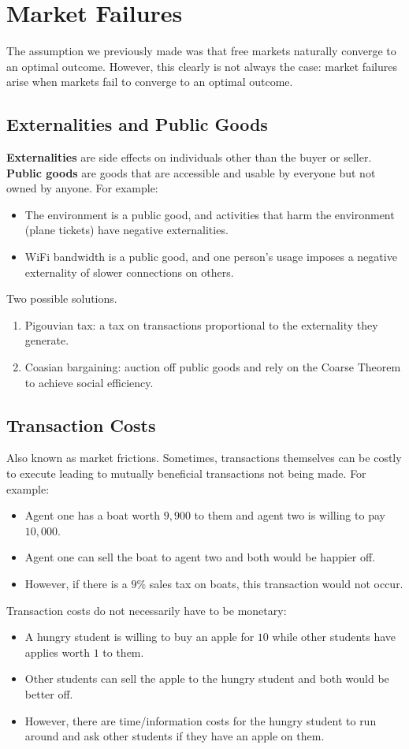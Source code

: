 \documentclass[dvipsnames]{article}
\theoremstyle{definition}
\theoremstyle{remark}
\begin{document}
\newpage

\section{Market Failures}
The assumption we previously made was that free markets naturally converge to an optimal outcome. However, this clearly is not always the case: market failures arise when markets fail to converge to an optimal outcome. 

\subsection{Externalities and Public Goods}
\textbf{Externalities} are side effects on individuals other than the buyer or seller. \textbf{Public goods} are goods that are accessible and usable by everyone but not owned by anyone. For example:
\begin{itemize}
	\item The environment is a public good, and activities that harm the environment (plane tickets) have negative externalities.
	\item WiFi bandwidth is a public good, and one person's usage imposes a negative externality of slower connections on others. 
\end{itemize}
Two possible solutions.
\begin{enumerate}
	\item Pigouvian tax: a tax on transactions proportional to the externality they generate.
	\item Coasian bargaining: auction off public goods and rely on the Coarse Theorem to achieve social efficiency. 
\end{enumerate}

\subsection{Transaction Costs}
Also known as market frictions. Sometimes, transactions themselves can be costly to execute leading to mutually beneficial transactions not being made. For example:
\begin{itemize}
	\item Agent one has a boat worth $9,900$ to them and agent two is willing to pay $10,000$.
	\item Agent one can sell the boat to agent two and both would be happier off. 
	\item However, if there is a $9\%$ sales tax on boats, this transaction would not occur. 
\end{itemize}
Transaction costs do not necessarily have to be monetary:
\begin{itemize}
	\item A hungry student is willing to buy an apple for $10$ while other students have applies worth $1$ to them. 
	\item Other students can sell the apple to the hungry student and both would be better off.
	\item However, there are time/information costs for the hungry student to run around and ask other students if they have an apple on them.
\end{itemize}
\end{document}
